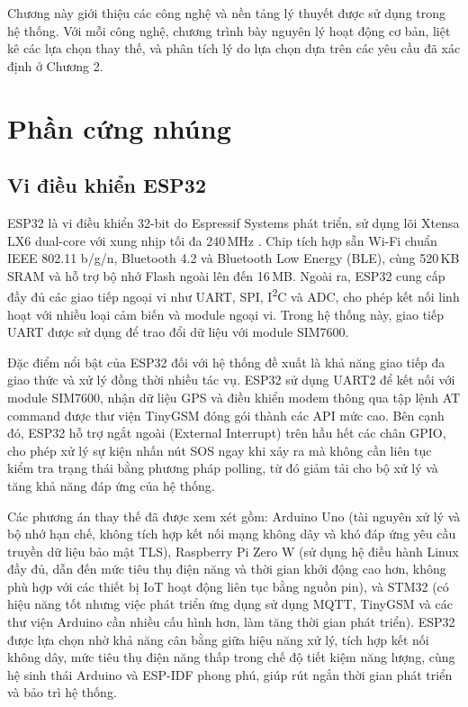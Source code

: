 \documentclass[../DoAn.tex]{subfiles}
\begin{document}
Chương này giới thiệu các công nghệ và nền tảng lý thuyết được sử dụng trong hệ thống. Với mỗi công nghệ, chương trình bày nguyên lý hoạt động cơ bản, liệt kê các lựa chọn thay thế, và phân tích lý do lựa chọn dựa trên các yêu cầu đã xác định ở Chương 2.

\section{Phần cứng nhúng}
\label{section:3.1}

\subsection{Vi điều khiển ESP32}
\label{subsection:3.1.1}

ESP32 là vi điều khiển 32-bit do Espressif Systems phát triển, sử dụng lõi Xtensa LX6 dual-core với xung nhịp tối đa 240\,MHz \cite{espressif_esp32}. Chip tích hợp sẵn Wi-Fi chuẩn IEEE 802.11 b/g/n, Bluetooth 4.2 và Bluetooth Low Energy (BLE), cùng 520\,KB SRAM và hỗ trợ bộ nhớ Flash ngoài lên đến 16\,MB. Ngoài ra, ESP32 cung cấp đầy đủ các giao tiếp ngoại vi như UART, SPI, I\textsuperscript{2}C và ADC, cho phép kết nối linh hoạt với nhiều loại cảm biến và module ngoại vi. Trong hệ thống này, giao tiếp UART được sử dụng để trao đổi dữ liệu với module SIM7600.

Đặc điểm nổi bật của ESP32 đối với hệ thống đề xuất là khả năng giao tiếp đa giao thức và xử lý đồng thời nhiều tác vụ. ESP32 sử dụng UART2 để kết nối với module SIM7600, nhận dữ liệu GPS và điều khiển modem thông qua tập lệnh AT command được thư viện TinyGSM đóng gói thành các API mức cao. Bên cạnh đó, ESP32 hỗ trợ ngắt ngoài (External Interrupt) trên hầu hết các chân GPIO, cho phép xử lý sự kiện nhấn nút SOS ngay khi xảy ra mà không cần liên tục kiểm tra trạng thái bằng phương pháp polling, từ đó giảm tải cho bộ xử lý và tăng khả năng đáp ứng của hệ thống.

Các phương án thay thế đã được xem xét gồm: Arduino Uno (tài nguyên xử lý và bộ nhớ hạn chế, không tích hợp kết nối mạng không dây và khó đáp ứng yêu cầu truyền dữ liệu bảo mật TLS), Raspberry Pi Zero W (sử dụng hệ điều hành Linux đầy đủ, dẫn đến mức tiêu thụ điện năng và thời gian khởi động cao hơn, không phù hợp với các thiết bị IoT hoạt động liên tục bằng nguồn pin), và STM32 (có hiệu năng tốt nhưng việc phát triển ứng dụng sử dụng MQTT, TinyGSM và các thư viện Arduino cần nhiều cấu hình hơn, làm tăng thời gian phát triển). ESP32 được lựa chọn nhờ khả năng cân bằng giữa hiệu năng xử lý, tích hợp kết nối không dây, mức tiêu thụ điện năng thấp trong chế độ tiết kiệm năng lượng, cùng hệ sinh thái Arduino và ESP-IDF phong phú, giúp rút ngắn thời gian phát triển và bảo trì hệ thống.
\end{document}
